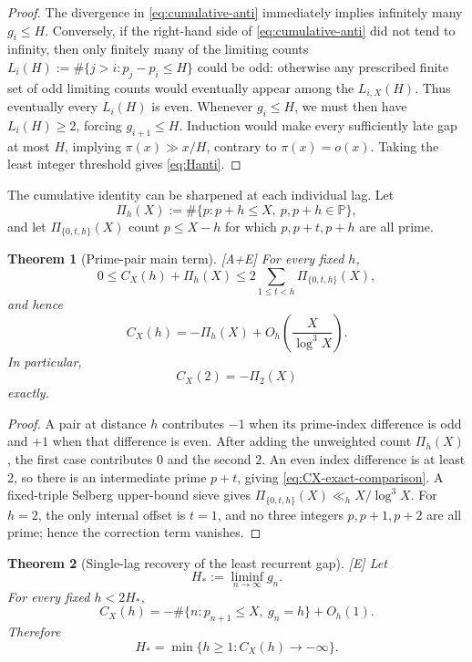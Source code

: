\documentclass[11pt]{article}
\newtheorem{theorem}{Theorem}[section]
\theoremstyle{definition}
\theoremstyle{remark}
\newcommand{\PP}{\mathbb P}
\newcommand{\status}[1]{\textnormal{\textcolor{accent}{\footnotesize[#1]}}}
\begin{document}
\begin{proof}
The divergence in \eqref{eq:cumulative-anti} immediately implies infinitely many
$g_i\le H$.  Conversely, if the right-hand side of \eqref{eq:cumulative-anti} did not
tend to infinity, then only finitely many of the limiting counts
$L_i(H):=\#\{j>i:p_j-p_i\le H\}$ could be odd: otherwise any prescribed finite set of
odd limiting counts would eventually appear among the $L_{i,X}(H)$.  Thus eventually
every $L_i(H)$ is even.  Whenever $g_i\le H$, we must then have $L_i(H)\ge2$, forcing
$g_{i+1}\le H$.  Induction would make every
sufficiently late gap at most $H$, implying $\pi(x)\gg x/H$, contrary to
$\pi(x)=o(x)$.  Taking the least integer threshold gives \eqref{eq:Hanti}.
\end{proof}

The cumulative identity can be sharpened at each individual lag.  Let
\[
 \Pi_h(X):=\#\{p:p+h\le X,\ p,p+h\in\PP\},
\]
and let $\Pi_{\{0,t,h\}}(X)$ count $p\le X-h$ for which
$p,p+t,p+h$ are all prime.

\begin{theorem}[Prime-pair main term]\label{thm:CX-pair-main}
\status{A+E}
For every fixed $h$,
\begin{equation}\label{eq:CX-exact-comparison}
 0\le C_X(h)+\Pi_h(X)
 \le2\sum_{1\le t<h}\Pi_{\{0,t,h\}}(X),
\end{equation}
and hence
\begin{equation}\label{eq:CX-asymptotic}
 C_X(h)=-\Pi_h(X)+O_h\!\left(\frac{X}{\log^3X}\right).
\end{equation}
In particular,
\begin{equation}\label{eq:CX2}
 C_X(2)=-\Pi_2(X)
\end{equation}
exactly.
\end{theorem}

\begin{proof}
A pair at distance $h$ contributes $-1$ when its prime-index difference is odd and $+1$
when that difference is even.  After adding the unweighted count $\Pi_h(X)$, the first
case contributes $0$ and the second $2$.  An even index difference is at least $2$, so
there is an intermediate prime $p+t$, giving \eqref{eq:CX-exact-comparison}.  A
fixed-triple Selberg upper-bound sieve gives
$\Pi_{\{0,t,h\}}(X)\ll_hX/\log^3X$.  For $h=2$, the only internal offset is $t=1$,
and no three integers $p,p+1,p+2$ are all prime; hence the correction term vanishes.
\end{proof}

\begin{theorem}[Single-lag recovery of the least recurrent gap]\label{thm:single-lag-gap}
\status{E}
Let
\[
 H_*:=\liminf_{n\to\infty}g_n.
\]
For every fixed $h<2H_*$,
\begin{equation}\label{eq:CX-consecutive-gap}
 C_X(h)=-\#\{n:p_{n+1}\le X,\ g_n=h\}+O_h(1).
\end{equation}
Therefore
\begin{equation}\label{eq:single-lag-threshold}
 H_*=\min\{h\ge1:C_X(h)\to-\infty\}.
\end{equation}
\end{theorem}
\end{document}
